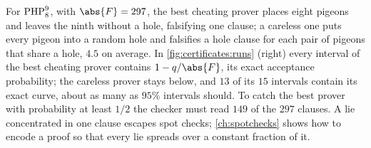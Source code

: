 \begin{refsection}
For $\mathrm{PHP}^{9}_{8}$, with $\abs{F}=297$, the best cheating prover places eight pigeons and leaves the ninth without a hole, falsifying one clause; a careless one puts every pigeon into a random hole and falsifies a hole clause for each pair of pigeons that share a hole, $4.5$ on average. In \cref{fig:certificates:runs} (right) every interval of the best cheating prover contains $1-q/\abs{F}$, its exact acceptance probability; the careless prover stays below, and $13$ of its $15$ intervals contain its exact curve, about as many as $95\%$ intervals should. To catch the best prover with probability at least $1/2$ the checker must read $149$ of the $297$ clauses. A lie concentrated in one clause escapes spot checks; \cref{ch:spotchecks} shows how to encode a proof so that every lie spreads over a constant fraction of it.


\end{refsection}
